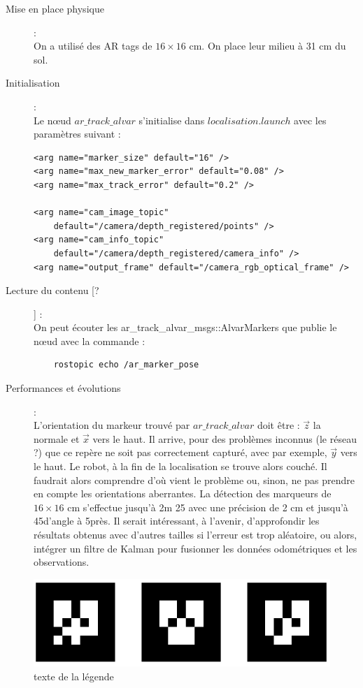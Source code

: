 \documentclass[10pt,a4paper]{article}
\begin{document}
\lstset{language=XML}
\begin{description}
\item [Mise en place physique] : \\
 On a utilisé des AR tags de $16 \times 16$ cm. On place leur milieu à 31 cm du sol.
\item [Initialisation] : \\ Le nœud $ar\_track\_alvar$ s'initialise dans $localisation.launch$ avec les paramètres suivant : 
\begin{lstlisting}
<arg name="marker_size" default="16" />
<arg name="max_new_marker_error" default="0.08" />
<arg name="max_track_error" default="0.2" />

<arg name="cam_image_topic" 
	default="/camera/depth_registered/points" />
<arg name="cam_info_topic" 		
	default="/camera/depth_registered/camera_info" />
<arg name="output_frame" default="/camera_rgb_optical_frame" />
\end{lstlisting}

\item [Lecture du contenu [?]] : \\
	On peut écouter les ar\_track\_alvar\_msgs::AlvarMarkers que publie le nœud avec la commande : 
	\begin{lstlisting} 
	rostopic echo /ar_marker_pose
	\end{lstlisting}
\item [Performances et évolutions] : \\
	L'orientation du markeur trouvé par $ar\_track\_alvar$ doit être : $\vec{z}$ la normale et $\vec{x}$ vers le haut. Il arrive, pour des problèmes inconnus (le réseau ?) que ce repère ne soit pas correctement capturé, avec par exemple, $\vec{y}$ vers le haut. Le robot, à la fin de la localisation se trouve alors couché. Il faudrait alors comprendre d'où vient le problème ou, sinon, ne pas prendre en compte les orientations aberrantes. 
	La détection des marqueurs de $16 \times 16$ cm s'effectue jusqu'à 2m 25 avec une précision de 2 cm et jusqu'à 45\degres d'angle à 5\degres près. Il serait intéressant, à l'avenir, d'approfondir les résultats obtenus avec d'autres tailles si l'erreur est trop aléatoire, ou alors, intégrer un filtre de Kalman pour fusionner les données odométriques et les observations.

\end{description}


\begin{figure}
\center
\includegraphics[scale=0.6]{figures/artags.png} 
\caption{texte de la légende}	
\end{figure}
\end{document}
